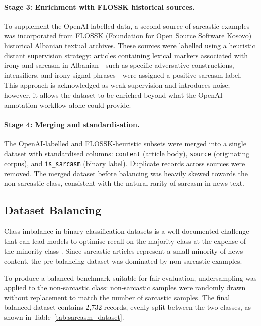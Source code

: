 \documentclass[12pt,a4paper]{article}
\begin{document}
\paragraph{Stage 3: Enrichment with FLOSSK historical sources.}
To supplement the OpenAI-labelled data, a second source of sarcastic examples was incorporated from FLOSSK (Foundation for Open Source Software Kosovo) historical Albanian textual archives. These sources were labelled using a heuristic distant supervision strategy: articles containing lexical markers associated with irony and sarcasm in Albanian---such as specific adversative constructions, intensifiers, and irony-signal phrases---were assigned a positive sarcasm label. This approach is acknowledged as weak supervision and introduces noise; however, it allows the dataset to be enriched beyond what the OpenAI annotation workflow alone could provide.

\paragraph{Stage 4: Merging and standardisation.}
The OpenAI-labelled and FLOSSK-heuristic subsets were merged into a single dataset with standardised columns: \texttt{content} (article body), \texttt{source} (originating corpus), and \texttt{is\_sarcasm} (binary label). Duplicate records across sources were removed. The merged dataset before balancing was heavily skewed towards the non-sarcastic class, consistent with the natural rarity of sarcasm in news text.

\subsection{Dataset Balancing}
\label{subsec:balancing}

Class imbalance in binary classification datasets is a well-documented challenge that can lead models to optimise recall on the majority class at the expense of the minority class \citep{pedregosa2011scikit}. Since sarcastic articles represent a small minority of news content, the pre-balancing dataset was dominated by non-sarcastic examples.

To produce a balanced benchmark suitable for fair evaluation, undersampling was applied to the non-sarcastic class: non-sarcastic samples were randomly drawn without replacement to match the number of sarcastic samples. The final balanced dataset contains 2,732 records, evenly split between the two classes, as shown in Table~\ref{tab:sarcasm_dataset}.
\end{document}
